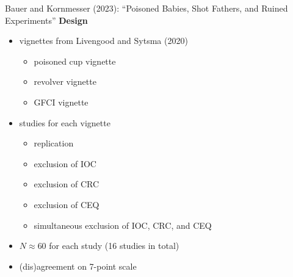 \documentclass[xcolor=table,9pt,aspectratio=169]{beamer}
\begin{document}
\begin{frame}{\vspace*{10mm}Bauer and Kornmesser (2023): ``Poisoned Babies, Shot Fathers, and Ruined Experiments''}
\vspace*{-5mm}
\textbf{Design}\\
\begin{itemize}
   \item vignettes from Livengood and Sytsma (2020)
      \begin{itemize}
         \item poisoned cup vignette
         \item revolver vignette
         \item GFCI vignette
      \end{itemize}
   \item studies for each vignette
      \begin{itemize}
         \item replication
         \item exclusion of IOC
         \item exclusion of CRC
         \item exclusion of CEQ
         \item simultaneous exclusion of IOC, CRC, and CEQ
      \end{itemize}
   \item $N\approx 60$ for each study (16 studies in total)
   \item (dis)agreement on 7-point scale
\end{itemize}
\vfill
\end{frame}
\end{document}
